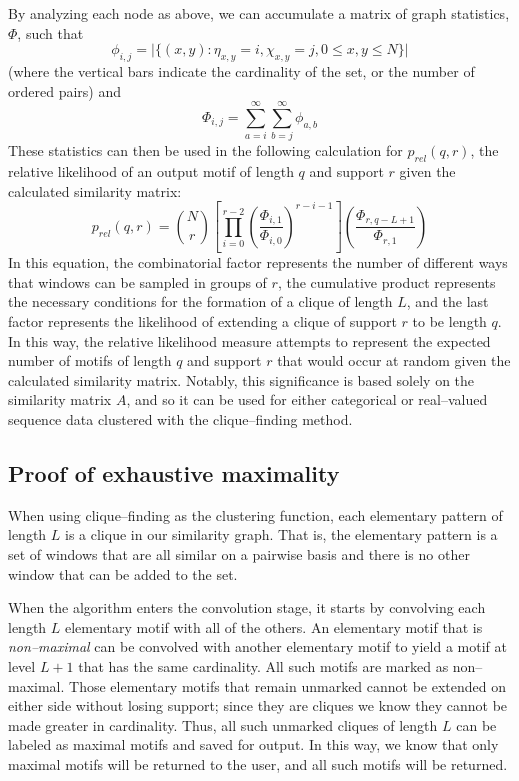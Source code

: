     By analyzing each node as above, we can accumulate a matrix of
    graph statistics, $\Phi$, such that
    \begin{equation}
    \phi_{i,j} = \vert \{(x,y) : \eta_{x,y} = i,\chi_{x,y} = j,
    0 \le x,y \leq N\} \vert
    \end{equation}
    (where the vertical bars indicate the cardinality of the set, or the
    number of ordered pairs) and
    \begin{equation}
    \Phi_{i,j} = \sum_{a=i}^\infty \sum_{b=j}^\infty \phi_{a,b}
    \end{equation}
    These statistics can then be used
    in the following calculation for $p_{rel}(q,r)$, the relative likelihood
    of an output motif of length $q$ and support $r$
    given the calculated similarity matrix:
    \begin{equation}
    p_{rel}(q,r) = \binom{N}{r}
    \left[\prod_{i=0}^{r-2}
    \left(\frac{\Phi_{i,1}}{\Phi_{i,0}}\right)^{r-i-1}\right]
    \left(\frac{\Phi_{r,q-L+1}}{\Phi_{r,1}}\right)
    \end{equation}
    In this equation, the combinatorial factor represents the number of
    different ways that windows can be sampled in groups of $r$, the
    cumulative product represents the necessary
    conditions for the formation of a clique of length $L$, and the
    last factor represents the likelihood of extending a clique of support
    $r$ to be length $q$.  In this way, the relative likelihood
    measure attempts to represent the expected number of motifs of length
    $q$ and support $r$ that would occur at random given the
    calculated similarity matrix.  Notably, this significance is based
    solely on the similarity matrix $A$, and so it can be used for either
    categorical or real--valued sequence data clustered with the
    clique--finding method.



    \subsection{Proof of exhaustive maximality}
    When using clique--finding as the clustering function,
    each elementary pattern of length $L$ is a clique
    in our similarity graph.  That is, the elementary pattern is
    a set of windows that are all similar on a pairwise basis and
    there is no other window that can be added to the set.

    When the algorithm enters the convolution stage, it starts
    by convolving each length $L$ elementary motif
    with all of the others.  An elementary motif that is
    \emph{non--maximal} can be convolved with another elementary
    motif to yield a motif at level $L+1$  that has the
    same cardinality.  All such motifs are marked as non--maximal.
    Those elementary motifs that remain unmarked cannot be extended on
    either side without losing support; since they are cliques
    we know they cannot be made greater in cardinality.
    Thus, all such unmarked cliques of length $L$ can be labeled as
    maximal motifs and saved for output.  In this way,
    we know that only maximal motifs will be returned to the user, and
    all such motifs will be returned.

